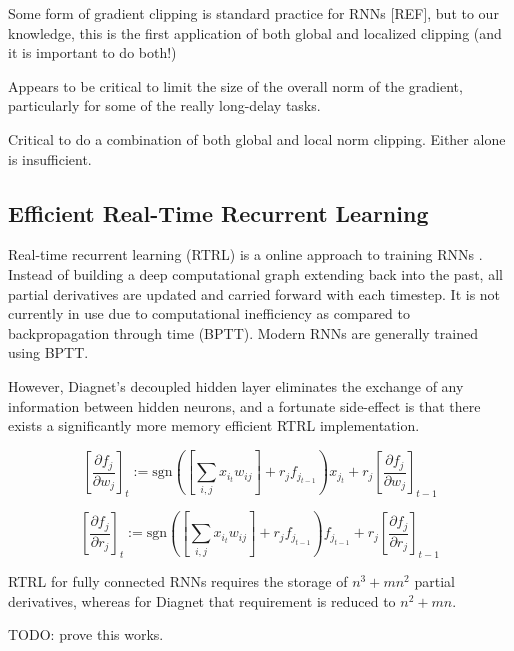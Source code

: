 \documentclass{article}
\begin{document}
Some form of gradient clipping is standard practice for RNNs [REF], but to our knowledge, this is the first application of both global and localized clipping (and it is important to do both!)

Appears to be critical to limit the size of the overall norm of the gradient, particularly for some of the really long-delay tasks.

Critical to do a combination of both global and local norm clipping. Either alone is insufficient.

\subsection{Efficient Real-Time Recurrent Learning}

Real-time recurrent learning (RTRL) is a online approach to training RNNs \citep{RTRL}. Instead of building a deep computational graph extending back into the past, all partial derivatives are updated and carried forward with each timestep. It is not currently in use due to computational inefficiency as compared to backpropagation through time (BPTT). Modern RNNs are generally trained using BPTT. 

However, Diagnet's decoupled hidden layer eliminates the exchange of any information between hidden neurons, and a fortunate side-effect is that there exists a significantly more memory efficient RTRL implementation.

\begin{equation}
{\left[ {\frac{\partial f_j}{\partial w_j}} \right]}_t := \textrm{sgn}\left( \left[ \sum_{i, j} x_{i_t} w_{ij }\right] + r_j f_{j_{t-1}} \right) x_{j_t} + r_j {\left[ {\frac{\partial f_j}{\partial w_j}} \right]}_{t-1}
\end{equation}

\begin{equation}
{\left[ {\frac{\partial f_j}{\partial r_j}} \right]}_t := \textrm{sgn}\left( \left[ \sum_{i, j} x_{i_t} w_{ij }\right] + r_j f_{j_{t-1}} \right) f_{j_{t-1}} + r_j {\left[ {\frac{\partial f_j}{\partial r_j}} \right]}_{t-1}
\end{equation}

RTRL for fully connected RNNs requires the storage of $n^3 + mn^2$ partial derivatives, whereas for Diagnet that requirement is reduced to $n^2 + mn$.

TODO: prove this works.
\end{document}
